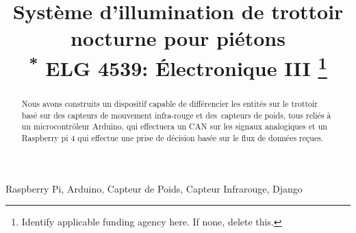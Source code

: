 \documentclass[journal]{IEEEtran}
\begin{document}
\title{Système d’illumination de trottoir nocturne pour piétons \\
{\footnotesize \textsuperscript{*} ELG 4539: Électronique III}
\thanks{Identify applicable funding agency here. If none, delete this.}
}

\author{
\and
{}

}

\maketitle

\begin{abstract}
    Nous avons construits un dispositif capable de différencier les entités 
    sur le trottoir basé sur des capteurs de mouvement infra-rouge et des capteurs de poids, 
    tous reliés à un microcontrôleur Arduino, qui effectuera un CAN sur les signaux analogiques 
    et un Raspberry pi 4 qui effectue une prise de décision basée sur le flux de données reçues.
\end{abstract}

\begin{IEEEkeywords}
Raspberry Pi, Arduino, Capteur de Poids, Capteur Infrarouge, Django
\end{IEEEkeywords}
\end{document}
